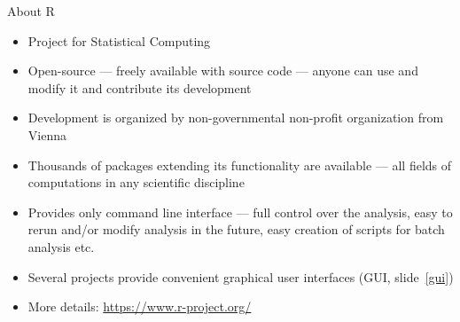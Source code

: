 \documentclass[compress, ucs, xelatex, 11pt, xcolor=svgnames, aspectratio=169,
	hyperref={
		bookmarks=true,
		unicode=true,
		colorlinks=true,
		pdftitle={Molecular data in R},
		plainpages=false,
		pdfauthor={Vojtech Zeisek},
		pdfsubject={Course about phylogeny and evolution in R},
		pdfcreator={XeLaTeX},
		pdfkeywords={R, evolution, phylogeny, molecular data},
		linkcolor=Crimson, %
		anchorcolor=Magenta, %
		citecolor=Magenta, %
		filecolor=Magenta, %
		menucolor=Magenta, %
		urlcolor=DodgerBlue, %
		pdftex},
	url={hyphens, lowtilde} %
	]{beamer}
\begin{document}
\begin{frame}{About R}
	\begin{itemize}
		\item Project for Statistical Computing
		\item Open-source --- freely available with source code --- anyone can use and modify it and contribute its development
		\item Development is organized by non-governmental non-profit organization from Vienna
		\item Thousands of packages extending its functionality are available --- all fields of computations in any scientific discipline
		\item Provides only command line interface --- full control over the analysis, easy to rerun and/or modify analysis in the future, easy creation of scripts for batch analysis etc.
		\item Several projects provide convenient graphical user interfaces (GUI, slide~\ref{gui})
		\item More details: \url{https://www.r-project.org/}
	\end{itemize}
\end{frame}
\end{document}
